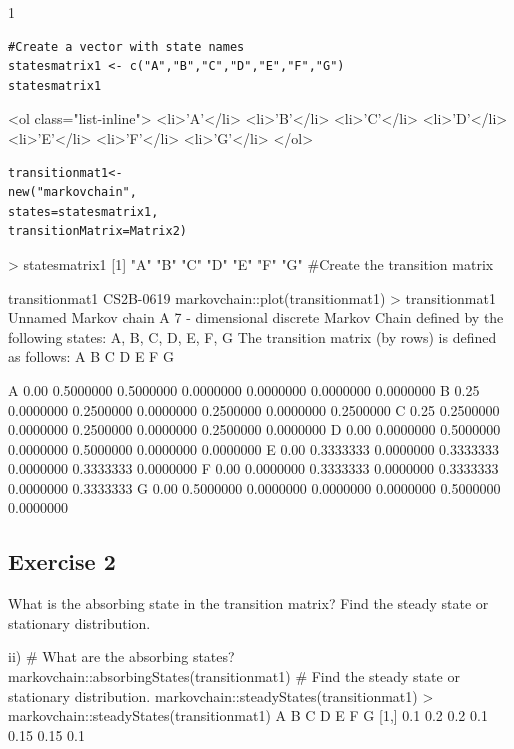 \documentclass[a4paper,12pt]{article}
\begin{document}
1




\begin{framed}\begin{verbatim}
#Create a vector with state names
statesmatrix1 <- c("A","B","C","D","E","F","G")
statesmatrix1
\end{verbatim}\end{framed}


<ol class="list-inline">
	<li>'A'</li>
	<li>'B'</li>
	<li>'C'</li>
	<li>'D'</li>
	<li>'E'</li>
	<li>'F'</li>
	<li>'G'</li>
</ol>




\begin{framed}\begin{verbatim}
transitionmat1<-
new("markovchain",
states=statesmatrix1,
transitionMatrix=Matrix2)
\end{verbatim}\end{framed}






> statesmatrix1
[1] "A" "B" "C" "D" "E" "F" "G"
#Create the transition matrix



transitionmat1
CS2B-0619
markovchain::plot(transitionmat1)
> transitionmat1
Unnamed Markov chain
A 7 - dimensional discrete Markov Chain defined by the following states:
A, B, C, D, E, F, G
The transition matrix (by rows) is defined as follows:
A
B
C
D
E
F
G


A 0.00 0.5000000 0.5000000 0.0000000 0.0000000 0.0000000 0.0000000
B 0.25 0.0000000 0.2500000 0.0000000 0.2500000 0.0000000 0.2500000
C 0.25 0.2500000 0.0000000 0.2500000 0.0000000 0.2500000 0.0000000
D 0.00 0.0000000 0.5000000 0.0000000 0.5000000 0.0000000 0.0000000
E 0.00 0.3333333 0.0000000 0.3333333 0.0000000 0.3333333 0.0000000
F 0.00 0.0000000 0.3333333 0.0000000 0.3333333 0.0000000 0.3333333
G 0.00 0.5000000 0.0000000 0.0000000 0.0000000 0.5000000 0.0000000


\newpage 
\subsection*{Exercise 2}
What is the absorbing state in the transition matrix? Find the steady state or stationary
distribution.



ii) # What are the absorbing states?
markovchain::absorbingStates(transitionmat1)
# Find the steady state or stationary distribution.
markovchain::steadyStates(transitionmat1)
> markovchain::steadyStates(transitionmat1)
A B C D E F G
[1,] 0.1 0.2 0.2 0.1 0.15 0.15 0.1
\end{document}
